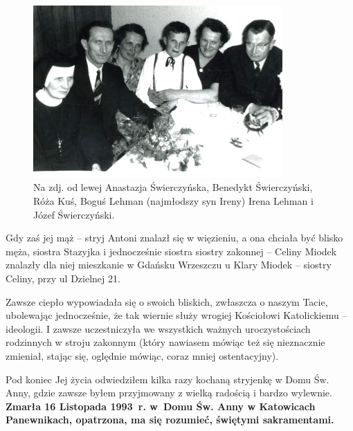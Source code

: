 \begin{figure}[!h]
\begin{center}
\includegraphics[width=0.85\textwidth]{photo/anastazja_swierczynska_5.jpg}
\caption[Rodzeństwo Świerczyńskich]{Na zdj. od lewej Anastazja Świerczyńska, Benedykt Świerczyński, Róża Kuś, Boguś Lehman (najmłodszy syn Ireny) Irena Lehman i Józef Świerczyński.}
\label{rys:anastazja_swierczynska_5}
\end{center}
\end{figure}

Gdy zaś jej mąż -- stryj Antoni znalazł się w więzieniu, a ona chciała być blisko męża, siostra Stazyjka i jednocześnie siostra siostry zakonnej – Celiny Miodek znalazły dla niej mieszkanie w Gdańsku Wrzeszczu u Klary Miodek – siostry Celiny, przy ul Dzielnej 21.

Zawsze ciepło wypowiadała się o swoich bliskich, zwłaszcza o naszym Tacie, ubolewając jednocześnie, że tak wiernie służy wrogiej Kościołowi Katolickiemu – ideologii. I zawsze uczestniczyła we wszystkich ważnych uroczystościach rodzinnych w stroju zakonnym (który nawiasem mówiąc też się nieznacznie zmieniał, stając się, oględnie mówiąc, coraz mniej ostentacyjny).

Pod koniec Jej życia odwiedziłem kilka razy kochaną stryjenkę w Domu Św. Anny, gdzie zawsze byłem przyjmowany z wielką radością i bardzo wylewnie. \textbf{Zmarła 16 Listopada 1993~r. w~Domu Św. Anny w Katowicach Panewnikach, opatrzona, ma się rozumieć, świętymi sakramentami.}
